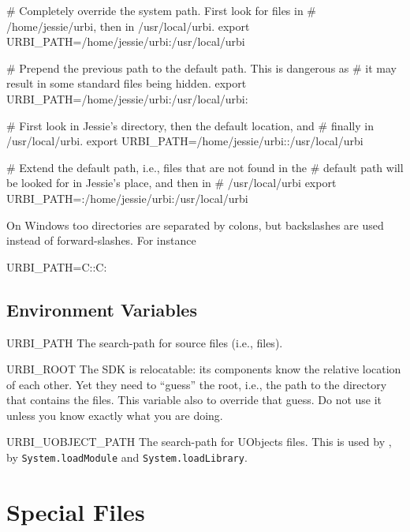 \begin{shell}
# Completely override the system path.  First look for files in
# /home/jessie/urbi, then in /usr/local/urbi.
export URBI_PATH=/home/jessie/urbi:/usr/local/urbi

# Prepend the previous path to the default path.  This is dangerous as
# it may result in some standard files being hidden.
export URBI_PATH=/home/jessie/urbi:/usr/local/urbi:

# First look in Jessie's directory, then the default location, and
# finally in /usr/local/urbi.
export URBI_PATH=/home/jessie/urbi::/usr/local/urbi

# Extend the default path, i.e., files that are not found in the
# default path will be looked for in Jessie's place, and then in
# /usr/local/urbi
export URBI_PATH=:/home/jessie/urbi:/usr/local/urbi
\end{shell}

\begin{windows}
  On Windows too directories are separated by colons, but backslashes
  are used instead of forward-slashes.  For instance
\begin{shell}
URBI_PATH=C:\cygwin\home\jessie\urbi:C:\cygwin\usr\local\urbi
\end{shell}
\end{windows}

\subsection{Environment Variables}
\begin{envs}
\item[URBI\_PATH] The search-path for \us source files (i.e.,
   files).

\item[URBI\_ROOT] The \urbi SDK is relocatable: its components know the
  relative location of each other.  Yet they need to ``guess'' the
  \urbi root, i.e., the path to the directory that contains the files.
  This variable also to override that guess.  Do not use it unless you
  know exactly what you are doing.

\item[URBI\_UOBJECT\_PATH] The search-path for UObjects files.
  This is used by , by
  \lstinline|System.loadModule| and \lstinline|System.loadLibrary|.
\end{envs}

\section{Special Files}
\label{sec:tools:files}

